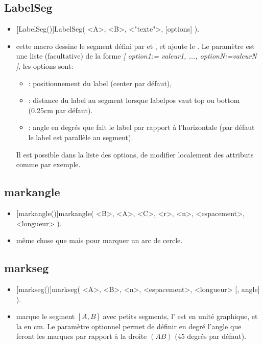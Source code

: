 \subsection{LabelSeg}

\begin{itemize}
 \item \util \textbf[LabelSeg()]{LabelSeg( <A>, <B>, <"texte">, [options] )}.
 \item \desc cette macro dessine le segment défini par  et , et ajoute le . Le paramètre  est une liste (facultative) de la forme \textsl{[ option1:= valeur1, ..., optionN:=valeurN ]}, les options sont:
  \begin{itemize}
  \item {}: positionnement du label (center par défaut),
  \item {}: distance du label au segment lorsque labelpos vaut top ou bottom (0.25cm par défaut).
  \item {}: angle en degrés que fait le label par rapport à l'horizontale (par défaut le label est parallèle au segment).
  \end{itemize}
Il est possible dans la liste des options, de modifier localement des attributs comme  par exemple.
\end{itemize}


\subsection{markangle}

\begin{itemize}
 \item \util \textbf[markangle()]{markangle( <B>, <A>, <C>, <r>, <n>, <espacement>, <longueur> )}.
 \item \desc même chose que  mais pour marquer un arc de cercle.
\end{itemize}


\subsection{markseg}\label{cmdmarkseg}

\begin{itemize}
 \item \util \textbf[markseg()]{markseg( <A>, <B>, <n>, <espacement>, <longueur> [, angle] )}.
 \item \desc marque le segment $[A,B]$ avec  petits segments, l' est en unité graphique, et la  en cm. Le paramètre optionnel  permet de définir en degré l'angle que feront les marques par rapport à la droite $(AB)$ (45 degrés par défaut). 
\end{itemize}


